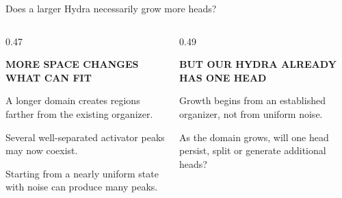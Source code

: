 \begin{frame}{Does a larger Hydra necessarily grow more heads?}

  \vspace{-0.16cm}

  \begin{columns}[c,onlytextwidth]
    \begin{column}{0.47\textwidth}
      {\color{HydraGold}\bfseries\fontsize{7.7}{9.2}\selectfont
        MORE SPACE CHANGES WHAT CAN FIT\par}

      \vspace{0.16cm}

        {A longer domain creates regions farther from the existing organizer.}

      \vspace{-0.12cm}

        {Several well-separated activator peaks may now coexist.}

      \vspace{-0.12cm}

        {Starting from a nearly uniform state with noise can produce many peaks.}
    \end{column}

    \begin{column}{0.49\textwidth}
      {\color{HydraMuted}\bfseries\fontsize{7.7}{9.2}\selectfont
        BUT OUR HYDRA ALREADY HAS ONE HEAD\par}

      \vspace{0.16cm}

        {Growth begins from an established organizer, not from uniform noise.}

      \vspace{-0.12cm}


      \vspace{-0.12cm}

        {As the domain grows, will one head persist, split or generate additional heads?}
    \end{column}
  \end{columns}

  \vspace{0.14cm}

\end{frame}


